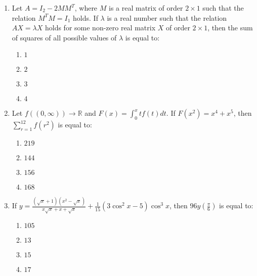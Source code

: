 \documentclass[journal]{IEEEtran}
\newcommand{\brak}[1]{\left( #1 \right)}
\begin{document}
\begin{enumerate}
        \begin{multicols}{4}
        \begin{enumerate}
        \item $1$
        \item $7$
        \item $8$
        \item $9$
        \end{enumerate}
        \end{multicols}

    \item Let $A=I_{2}-2MM^{T}$, where $M$ is a real matrix of order $2\times1$ such that the relation $M^{T}M=I_{1}$ holds. If $\lambda$ is a real number such that the relation $AX=\lambda X$ holds for some non-zero real matrix $X$ of order $2\times1$, then the sum of squares of all possible values of $\lambda$ is equal to:

        \begin{multicols}{4}
        \begin{enumerate}
        \item $1$
        \item $2$
        \item $3$
        \item $4$
        \end{enumerate}
        \end{multicols}
                
    \item Let $f\brak{(0,\infty)}\rightarrow\mathbb{R}$ and $F(x)=\int_{0}^{x}tf(t)dt$. If $F\brak{x^{2}}=x^{4}+x^{5}$, then $\sum_{r=1}^{12}f\brak{r^{2}}$ is equal to:

        \begin{multicols}{4}
        \begin{enumerate}
        \item $219$
        \item $144$
        \item $156$
        \item $168$
        \end{enumerate}
        \end{multicols}   

    \item If $y=\frac{(\sqrt{x}+1)\brak{x^{2}-\sqrt{x}}}{x\sqrt{x}+x+\sqrt{x}}+\frac{1}{15}\brak{3\cos^{2}x-5}\cos^{3}x$, then $96y\brak{\frac{\pi}{6}}$ is equal to:

        \begin{multicols}{4}
        \begin{enumerate}
        \item $105$
        \item $13$
        \item $15$
        \item $17$
        \end{enumerate}
        \end{multicols}


\end{enumerate}
\end{document}
